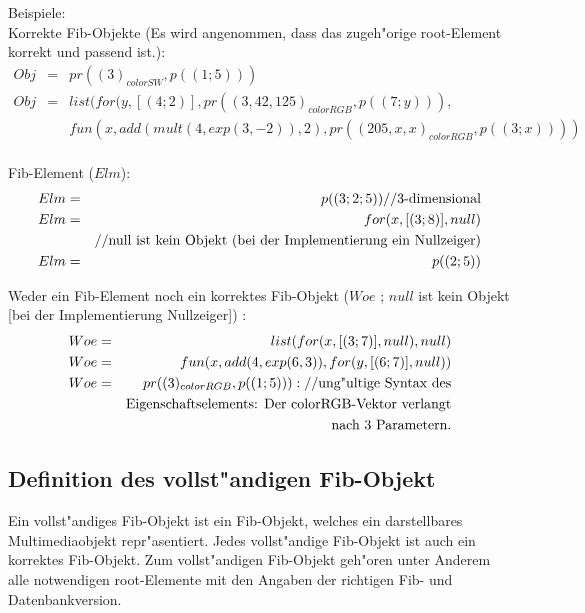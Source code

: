 \begin{flushleft}
Beispiele:\\
Korrekte Fib-Objekte (Es wird angenommen, dass das zugeh"orige root-Element korrekt und passend ist.):
\begin{eqnarray*}
Obj &=& pr( (3)_{colorSW}, p((1;5)))\\
Obj &=& list( for(y,[(4;2)], pr( (3, 42, 125)_{colorRGB} , p((7;y))), \\
&& fun(x,add( mult(4, exp( 3, -2)), 2 ), pr( (205, x ,x)_{colorRGB}, p((3;x)) ) )\\
\end{eqnarray*}

Fib-Element ($Elm$):
\begin{eqnarray*}
Elm &=& p((3;2;5)) \textnormal{//3-dimensional}\\
Elm &=& for(x,[(3;8)],null) \\
& & \textnormal{//null ist kein Objekt (bei der Implementierung ein Nullzeiger)}\\
Elm &=& p((2;5))\\
\end{eqnarray*}

Weder ein Fib-Element noch ein korrektes Fib-Objekt ($Woe$ ; $null$ ist kein Objekt [bei der Implementierung Nullzeiger]) :\\
\begin{eqnarray*}
Woe &=& list( for( x, [(3;7)], null), null)\\
Woe &=& fun( x, add(4, exp(6, 3) ) , for(y, [(6;7)], null))\\
Woe &=& pr( (3)_{colorRGB}, p((1;5)) ): \textnormal{//ung"ultige Syntax des} \\
&& \textnormal{Eigenschaftselements: Der colorRGB-Vektor verlangt}\\
&& \textnormal{nach 3 Parametern.}\\
\end{eqnarray*}

\end{flushleft}


\subsection{Definition des vollst"andigen Fib-Objekt}
\label{secFullFibObject}

Ein vollst"andiges Fib-Objekt ist ein Fib-Objekt, welches ein darstellbares Multimediaobjekt repr"asentiert. Jedes vollst"andige Fib-Objekt ist auch ein korrektes Fib-Objekt. Zum vollst"andigen Fib-Objekt geh"oren unter Anderem alle notwendigen root-Elemente mit den Angaben der richtigen Fib- und Datenbankversion.


